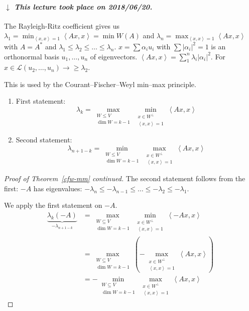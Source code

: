 \documentclass{article}
\numberwithin{lecref}{section}
\newcommand{\angel}[1]{\left\langle#1\right\rangle}
\newcommand{\card}[1]{\left|#1\right|}
\newcommand{\dateref}[1]{%
  \begin{mdframed}[backgroundcolor=gray!10,innerbottommargin=0pt,innertopmargin=0pt]
    \paragraph{\textit{$\downarrow$ This lecture took place on #1.}}%
  \end{mdframed}%
}
\begin{document}
\dateref{2018/06/20}

The Rayleigh-Ritz coefficient gives us $\lambda_1 = \min_{\angel{x,x} = 1} \angel{Ax, x} = \min{W(A)}$ and $\lambda_n = \max_{\angel{x,x} = 1} \angel{Ax, x}$ with $A = A^*$ and $\lambda_1 \leq \lambda_2 \leq \dots \leq \lambda_n$. $x = \sum \alpha_i u_i$ with $\sum \card{\alpha_i}^2 = 1$ is an orthonormal basis $u_1, \dots, u_n$ of eigenvectors. $\angel{Ax, x} = \sum_1^n \lambda_i \card{\alpha_i}^2$. For $x \in \mathcal L(u_2, \dots, u_n) \to \geq \lambda_2$.

This is used by the Courant--Fischer--Weyl min--max principle.

\begin{enumerate}
  \item First statement:
    \[ \lambda_k = \max_{\substack{W \leq V \\ \dim{W} = k-1}} \min_{\substack{x \in W^\bot \\ \angel{x, x} = 1}} \angel{Ax, x} \]
  \item Second statement:
    \[ \lambda_{n+1-k} = \min_{\substack{W \leq V \\ \dim{W} = k-1}} \max_{\substack{x \in W^\bot \\ \angel{x,x} = 1}} \angel{Ax, x} \]
\end{enumerate}

\begin{proof}[Proof of Theorem~\ref{cfw-mm} continued]
  The second statement follows from the first:
  $-A$ has eigenvalues: $-\lambda_n \leq -\lambda_{n-1} \leq \dots \leq -\lambda_{2} \leq -\lambda_1$.

  We apply the first statement on $-A$.
  \begin{align*}
    \underbrace{\lambda_k(-A)}_{-\lambda_{n+1-k}} &= \max_{\substack{W \subseteq V \\ \dim{W} = k-1}} \min_{\substack{x \in W^\bot \\ \angel{x, x} = 1}} \angel{-Ax, x} \\
      &= \max_{\substack{W\subseteq V \\ \dim{W} = k-1}} \left(- \max_{\substack{x \in W^\bot \\ \angel{x, x} = 1}} \angel{Ax, x}\right) \\
      &= -\min_{\substack{W \subseteq V \\ \dim{W} = k-1}} \max_{\substack{x \in W^\bot \\ \angel{x, x} = 1}} \angel{Ax, x}
  \end{align*}
\end{proof}
\end{document}
